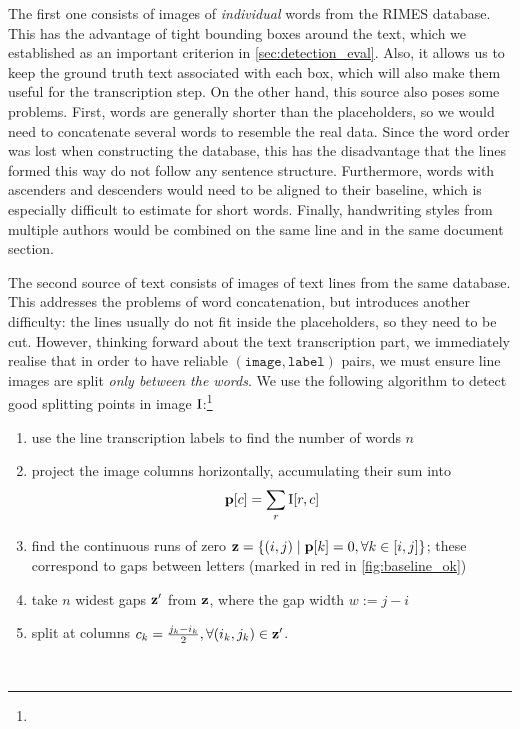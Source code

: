 			The first one consists of images of \emph{individual} words from the RIMES database. This has the advantage of tight bounding boxes around the text, which we established as an important criterion in \autoref{sec:detection_eval}. Also, it allows us to keep the ground truth text associated with each box, which will also make them useful for the transcription step. On the other hand, this source also poses some problems. First, words are generally shorter than the placeholders, so we would need to concatenate several words to resemble the real data. Since the word order was lost when constructing the database, this has the disadvantage that the lines formed this way do not follow any sentence structure. Furthermore, words with ascenders and descenders would need to be aligned to their baseline, which is especially difficult to estimate for short words. Finally, handwriting styles from multiple authors would be combined on the same line and in the same document section.

			The second source of text consists of images of text lines from the same database. This addresses the problems of word concatenation, but introduces another difficulty: the lines usually do not fit inside the placeholders, so they need to be cut. However, thinking forward about the text transcription part, we immediately realise that in order to have reliable \((\mathtt{image}, \mathtt{label})\) pairs, we must ensure line images are split \emph{only between the words}. We use the following algorithm to detect good splitting points in image \(\mathrm{I}\):\footnote{} %
			\noindent\begin{minipage}{\linewidth}
			\begin{enumerate}
				\item use the line transcription labels to find the number of words \(n\)
				\item project the image columns horizontally, accumulating their sum into \[
					\mathbf{p}[c] = \sum_r \mathrm{I}[r,c]
				\]
				\item find the continuous runs of zero \(\mathbf{z} = \{ (i, j) \mid \mathbf{p}[k] = 0, \forall k \in [i, j] \}\); these correspond to gaps between letters (marked in red in \autoref{fig:baseline_ok})
				\item take \(n\) widest gaps \(\mathbf{z}'\) from \(\mathbf{z}\), where the gap width \(w := j - i\)
				\item split at columns \(c_k = \frac{j_k - i_k}{2}, \forall (i_k, j_k) \in \mathbf{z}'\).
			\end{enumerate}
			\end{minipage}
			\\

